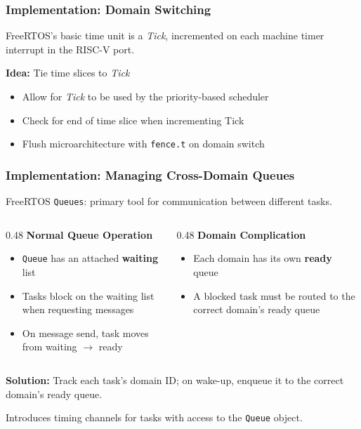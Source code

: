 \begin{frame}[fragile]
\frametitle{Implementation: Domain Switching}

FreeRTOS's basic time unit is a \emph{Tick}, incremented on each machine timer interrupt in the RISC-V port.

\vspace{0.1cm}

\textbf{Idea:} Tie time slices to \emph{Tick}
\vspace{0.2cm}
\begin{itemize}
  \item Allow for \emph{Tick} to be used by the priority-based scheduler
  \item Check for end of time slice when incrementing Tick
  \item Flush microarchitecture with \texttt{fence.t} on domain switch
\end{itemize}

\end{frame}


\begin{frame}[fragile]
\frametitle{Implementation: Managing Cross-Domain Queues}
FreeRTOS \texttt{Queues}: primary tool for communication between different tasks.

\vspace{0.2cm}

\begin{columns}[T]
\begin{column}{0.48\textwidth}
\textbf{Normal Queue Operation}
\begin{itemize}
  \item \texttt{Queue} has an attached \textbf{waiting} list
  \item Tasks block on the waiting list when requesting messages
  \item On message send, task moves from waiting $\to$ ready
\end{itemize}
\end{column}

\begin{column}{0.48\textwidth}
\textbf{Domain Complication}
\begin{itemize}
  \item Each domain has its own \textbf{ready} queue
  \item A blocked task must be routed to the correct domain's ready queue
\end{itemize}
\end{column}
\end{columns}

\vspace{0.2cm}

\textbf{Solution:} Track each task's domain ID; on wake-up, enqueue it to the correct domain's ready queue.

\vspace{0.15cm}
{\small Introduces timing channels for tasks with access to the \texttt{Queue} object.}

\end{frame}
